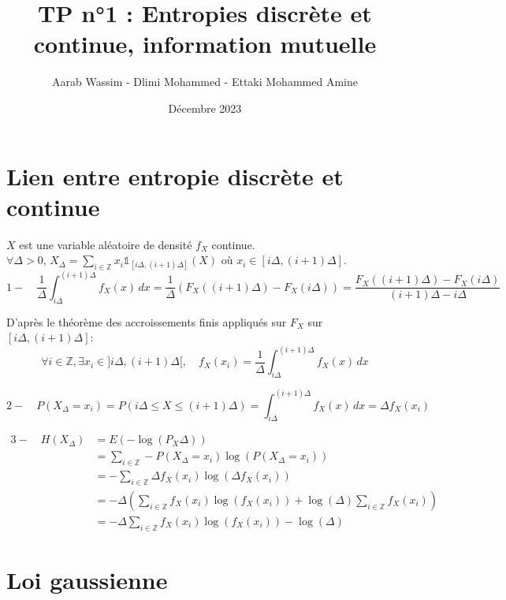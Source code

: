 \documentclass[a4paper]{article}
\title{TP n°1 : Entropies discrète et continue, information mutuelle}
\author{Aarab Wassim - Dlimi Mohammed - Ettaki Mohammed Amine}
\date{Décembre 2023}
\begin{document}
\maketitle
\tableofcontents
\newpage
\section{Lien entre entropie discrète et continue}
$X$ est une variable aléatoire de densité $f_{X}$ continue.\\
$\forall \Delta > 0$, $X_{\Delta} = \sum_{i\in \mathbb{Z}} x_{i}\mathbb{1}_{[i\Delta,(i+1)\Delta]}(X)$ où $x_i \in [i\Delta,(i+1)\Delta]$.\\

\[
1- \quad
\frac{1}{\Delta} \int_{i\Delta}^{(i+1)\Delta} f_X(x) \, dx = \frac{1}{\Delta} (F_X((i+1)\Delta) - F_X(i\Delta)) = \frac{F_X((i+1)\Delta) - F_X(i\Delta)}{(i+1)\Delta - i\Delta}
\]

D'après le théorème des accroissements finis appliqués sur $F_X$ sur $[i\Delta,(i+1)\Delta]$: \\
\[
\forall i \in \mathbb{Z}, \exists x_i \in ]i\Delta,(i+1)\Delta[, \quad f_X(x_i) = \frac{1}{\Delta} \int_{i\Delta}^{(i+1)\Delta} f_X(x) \,dx
\]

\[
2- \quad
P(X_\Delta = x_i) = P(i\Delta \leq X \leq (i+1)\Delta) = \int_{i\Delta}^{(i+1)\Delta} f_X(x) \, dx = \Delta f_X(x_i) 
\]

\begin{align*}
    3- \quad H(X_\Delta) & = E(-\log(P_X\Delta)) \\
    & = \sum_{i\in \mathbb{Z}} -P(X_\Delta=x_i)\log(P(X_\Delta = x_i)) \\
    & = - \sum_{i\in \mathbb{Z}} \Delta f_X(x_i)\log(\Delta f_X(x_i)) \\
    & = - \Delta\left(\sum_{i\in \mathbb{Z}} f_X(x_i)\log(f_X(x_i)) + \log(\Delta) \sum_{i\in \mathbb{Z}} f_X(x_i)\right) \\
    & = - \Delta\sum_{i\in \mathbb{Z}} f_X(x_i)\log(f_X(x_i)) - \log(\Delta)
\end{align*}


\newpage

\section{Loi gaussienne}
\end{document}

